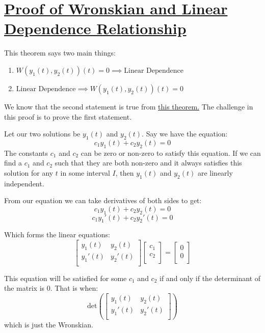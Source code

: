 \documentclass{report}
\begin{document}
\section{\hyperref[th:WrLinDep]{Proof of Wronskian and Linear Dependence Relationship}}
\label{sec:PrWrLinDep}
This theorem says two main things:
\begin{enumerate}
    
    \item$W(y_1(t), y_2(t))(t) = 0 \implies \text{Linear Dependence}$
    
    \item$ \text{Linear Dependence} \implies W(y_1(t), y_2(t))(t) = 0$
\end{enumerate}
We know that the second statement is true from \hyperref[th:wronLinDep]{this theorem.} The challenge in this proof is to prove the first statement.

Let our two solutions be $y_1(t)$ and $y_2(t)$. Say we have the equation:
$$c_1y_1(t) +c_2y_2(t) = 0$$
The constants $c_1$ and $c_2$ can be zero or non-zero to satisfy this equation. If we can find a $c_1$ and $c_2$ such that they are both non-zero and it always satisfies this solution for any $t$ in some interval $I$, then $y_1(t)$ and $y_2(t)$ are linearly independent.

From our equation we can take derivatives of both sides to get:
$$c_1y_1(t) +c_2y_2(t) = 0$$
$$c_1y_1'(t) +c_2y_2'(t) = 0$$

Which forms the linear equations:
$$
\begin{bmatrix}
    y_1(t) & y_2(t) \\
    y_1'(t) & y_2'(t) \\
\end{bmatrix}
\begin{bmatrix}
    c_1 \\
    c_2 \\
\end{bmatrix}
=
\begin{bmatrix}
    0 \\
    0 \\
\end{bmatrix}
$$

This equation will be satisfied for some $c_1$ and $c_2$ if and only if the determinant of the matrix is 0. That is when:
$$
\text{det}\left(\begin{bmatrix}
        y_1(t) & y_2(t) \\
        y_1'(t) & y_2'(t) \\
        \end{bmatrix}\right)
$$
which is just the Wronskian.
\end{document}

